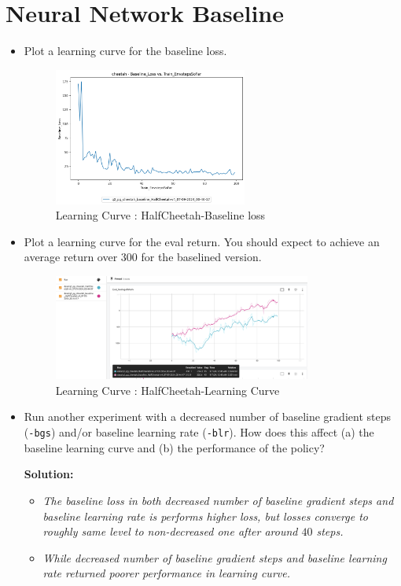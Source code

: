 \documentclass{article}
\begin{document}
\newpage\section{Neural Network Baseline}
\begin{itemize}
    \item Plot a learning curve for the baseline loss.
		\begin{figure}[ht]
			\centering
			\includegraphics[width=0.6\textwidth]{./images/5-HalfCheetah-baseline_loss.png}
			\caption{Learning Curve : HalfCheetah-Baseline loss}
			\label{fig:HalfCheetah-baseline_loss}
		\end{figure}
    \item Plot a learning curve for the eval return. You should expect to achieve an average return over 300 for the baselined version.
		\begin{figure}[ht]
			\centering
			\includegraphics[width=0.8\textwidth]{./images/5-HalfCheetah-learning_curve.png}
			\caption{Learning Curve : HalfCheetah-Learning Curve}
			\label{fig:HalfCheetah-Learning_Curve}
		\end{figure}
    \item Run another experiment with a decreased number of baseline gradient steps (\verb|-bgs|) and/or baseline learning rate (\verb|-blr|). How does this affect (a) the baseline learning curve and (b) the performance of the policy?
    
    \textbf{Solution:} 
    \begin{itemize}
    	\item \textit{The baseline loss in both decreased number of baseline gradient steps and baseline learning rate is performs higher loss, but losses converge to roughly same level to non-decreased one after around $40$ steps.}
    	\item \textit{While decreased number of baseline gradient steps and baseline learning rate returned poorer performance in learning curve.}
    \end{itemize}
    

\end{itemize}
\end{document}
